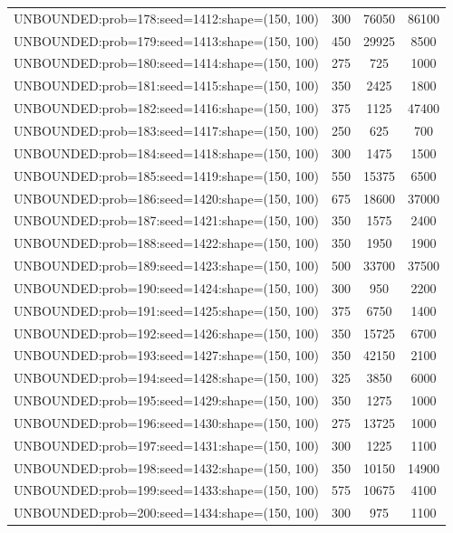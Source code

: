 \begin{longtable}{lccc}
UNBOUNDED:prob=178:seed=1412:shape=(150, 100) &      300 & 76050 &  86100 \\
UNBOUNDED:prob=179:seed=1413:shape=(150, 100) &      450 & 29925 &   8500 \\
UNBOUNDED:prob=180:seed=1414:shape=(150, 100) &      275 &   725 &   1000 \\
UNBOUNDED:prob=181:seed=1415:shape=(150, 100) &      350 &  2425 &   1800 \\
UNBOUNDED:prob=182:seed=1416:shape=(150, 100) &      375 &  1125 &  47400 \\
UNBOUNDED:prob=183:seed=1417:shape=(150, 100) &      250 &   625 &    700 \\
UNBOUNDED:prob=184:seed=1418:shape=(150, 100) &      300 &  1475 &   1500 \\
UNBOUNDED:prob=185:seed=1419:shape=(150, 100) &      550 & 15375 &   6500 \\
UNBOUNDED:prob=186:seed=1420:shape=(150, 100) &      675 & 18600 &  37000 \\
UNBOUNDED:prob=187:seed=1421:shape=(150, 100) &      350 &  1575 &   2400 \\
UNBOUNDED:prob=188:seed=1422:shape=(150, 100) &      350 &  1950 &   1900 \\
UNBOUNDED:prob=189:seed=1423:shape=(150, 100) &      500 & 33700 &  37500 \\
UNBOUNDED:prob=190:seed=1424:shape=(150, 100) &      300 &   950 &   2200 \\
UNBOUNDED:prob=191:seed=1425:shape=(150, 100) &      375 &  6750 &   1400 \\
UNBOUNDED:prob=192:seed=1426:shape=(150, 100) &      350 & 15725 &   6700 \\
UNBOUNDED:prob=193:seed=1427:shape=(150, 100) &      350 & 42150 &   2100 \\
UNBOUNDED:prob=194:seed=1428:shape=(150, 100) &      325 &  3850 &   6000 \\
UNBOUNDED:prob=195:seed=1429:shape=(150, 100) &      350 &  1275 &   1000 \\
UNBOUNDED:prob=196:seed=1430:shape=(150, 100) &      275 & 13725 &   1000 \\
UNBOUNDED:prob=197:seed=1431:shape=(150, 100) &      300 &  1225 &   1100 \\
UNBOUNDED:prob=198:seed=1432:shape=(150, 100) &      350 & 10150 &  14900 \\
UNBOUNDED:prob=199:seed=1433:shape=(150, 100) &      575 & 10675 &   4100 \\
UNBOUNDED:prob=200:seed=1434:shape=(150, 100) &      300 &   975 &   1100 \\

\end{longtable}
